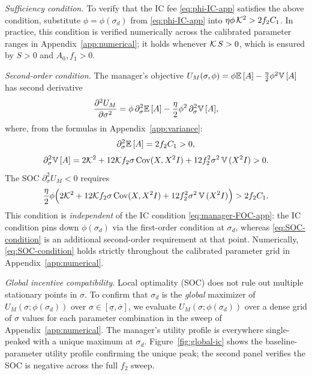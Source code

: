 \textit{Sufficiency condition.} To verify that the IC fee \eqref{eq:phi-IC-app} satisfies the above condition, substitute $\phi = \phi(\sigma_d)$ from \eqref{eq:phi-IC-app} into $\eta\phi\,\mathcal{K}^2 > 2f_2 C_1$. In practice, this condition is verified numerically across the calibrated parameter ranges in Appendix~\ref{app:numerical}; it holds whenever $\mathcal{K}\,S > 0$, which is ensured by $S>0$ and $A_0, f_1 > 0$.

\textit{Second-order condition.} The manager's objective $U_M(\sigma,\phi) = \phi{\mathbb{E}}\,[A] - \frac{\eta}{2}\phi^2{\mathbb{V}}\,[A]$ has second derivative
\begin{equation}
\frac{\partial^2 U_M}{\partial\sigma^2} = \phi\,\partial_\sigma^2{\mathbb{E}}\,[A] - \frac{\eta}{2}\phi^2\,\partial_\sigma^2{\mathbb{V}}\,[A], \label{eq:SOC-UM}
\end{equation}
where, from the formulas in Appendix~\ref{app:variance}:
\[
\partial_\sigma^2{\mathbb{E}}\,[A] = 2f_2 C_1 > 0,
\]
\[
\partial_\sigma^2{\mathbb{V}}\,[A] = 2\mathcal{K}^2 + 12\mathcal{K} f_2\sigma\,{\mathrm{Cov}}(X,X^2 I) + 12 f_2^2\sigma^2\,{\mathbb{V}}\,(X^2 I) > 0.
\]
The SOC $\partial^2_\sigma U_M < 0$ requires
\begin{equation}
\frac{\eta}{2}\phi\Bigl(2\mathcal{K}^2 + 12\mathcal{K} f_2\sigma\,{\mathrm{Cov}}(X,X^2 I) + 12 f_2^2\sigma^2\,{\mathbb{V}}\,(X^2 I)\Bigr) > 2f_2 C_1. \label{eq:SOC-condition}
\end{equation}
This condition is \emph{independent} of the IC condition \eqref{eq:manager-FOC-app}: the IC condition pins down $\phi(\sigma_d)$ via the first-order condition at $\sigma_d$, whereas \eqref{eq:SOC-condition} is an additional second-order requirement at that point. Numerically, \eqref{eq:SOC-condition} holds strictly throughout the calibrated parameter grid in Appendix~\ref{app:numerical}.

\textit{Global incentive compatibility.} Local optimality (SOC) does not rule out multiple stationary points in $\sigma$. To confirm that $\sigma_d$ is the \emph{global} maximizer of $U_M(\sigma;\phi(\sigma_d))$ over $\sigma\in[\underline\sigma,\overline\sigma]$, we evaluate $U_M(\sigma;\phi(\sigma_d))$ over a dense grid of $\sigma$ values for each parameter combination in the sweep of Appendix~\ref{app:numerical}. The manager's utility profile is everywhere single-peaked with a unique maximum at $\sigma_d$. Figure~\ref{fig:global-ic} shows the baseline-parameter utility profile confirming the unique peak; the second panel verifies the SOC is negative across the full $f_2$ sweep.

